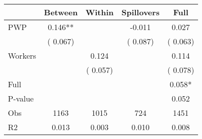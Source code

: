 
\begin{tabular}{l*{4}{c}}\hline&\multicolumn{1}{c}{Between}&\multicolumn{1}{c}{Within}&\multicolumn{1}{c}{Spillovers}&\multicolumn{1}{c}{Full}\\ \hline
 PWP           &              0.146**      &                                               &       -0.011 &         0.027                            \\ 
                               &        (       0.067)           &                                       &       (       0.087)     &      (       0.063)                                           \\ 
 Workers       &                                               &        0.124    &                                &             0.114                            \\ 
                               &                                               & (       0.057)                  &                                        &      (       0.078)                                           \\ 
\hline                                                                                                                                                                                                                                            
 Full                  &                                               &                                               &                                        &             0.058*                                     \\ 
 P-value               &                                               &                                               &                                        &             0.052                                           \\ 
 Obs                   &               1163               &       1015                       &       724                &              1451                                               \\ 
 R2                    &                      0.013              &              0.003                      &              0.010               &                     0.008                                              \\ 
\hline \end{tabular}                                                                                                                                                                                                              